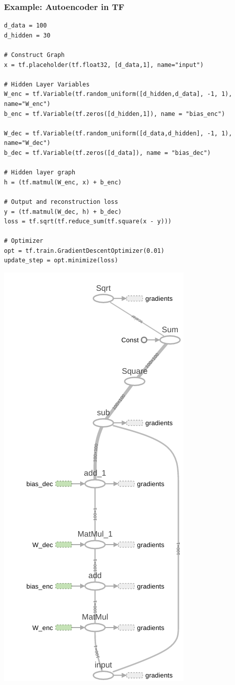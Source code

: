 \documentclass[mathserif]{beamer}
\begin{document}
\begin{frame}[fragile]
	\frametitle{Example: Autoencoder in TF}
	\begin{verbatim}
d_data = 100        
d_hidden = 30   

# Construct Graph
x = tf.placeholder(tf.float32, [d_data,1], name="input")
  
# Hidden Layer Variables
W_enc = tf.Variable(tf.random_uniform([d_hidden,d_data], -1, 1), name="W_enc")
b_enc = tf.Variable(tf.zeros([d_hidden,1]), name = "bias_enc")
  
W_dec = tf.Variable(tf.random_uniform([d_data,d_hidden], -1, 1), name="W_dec")
b_dec = tf.Variable(tf.zeros([d_data]), name = "bias_dec")
  
# Hidden layer graph
h = (tf.matmul(W_enc, x) + b_enc)

# Output and reconstruction loss
y = (tf.matmul(W_dec, h) + b_dec)
loss = tf.sqrt(tf.reduce_sum(tf.square(x - y)))
  
# Optimizer 
opt = tf.train.GradientDescentOptimizer(0.01)
update_step = opt.minimize(loss)
\end{verbatim}
\end{frame}


\begin{frame}[plain]
	\includegraphics[scale=0.32]{tensorboard-ae-graph.png}
\end{frame}
\end{document}
